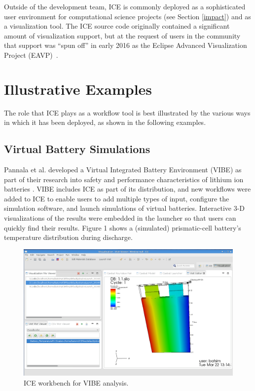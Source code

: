 Outside of the development team, ICE is commonly deployed as a
sophisticated user environment for computational science projects 
(see Section \ref{impact}) and as a visualization tool. The ICE source code originally contained a
significant amount of visualization support, but at the request of users
in the community that support was ``spun off'' in early 2016 as the 
Eclipse Advanced Visualization Project (EAVP)~\cite{billings_eclipse_2015}.

\section{Illustrative Examples}\label{illustrative-examples}

The role that ICE plays as a workflow tool is best illustrated by the
various ways in which it has been deployed, as shown in the following 
examples.

\subsection{Virtual Battery
Simulations}\label{virtual-battery-simulations}

Pannala et al. developed a Virtual Integrated Battery Environment (VIBE)
as part of their research into safety and performance characteristics of
lithium ion batteries \cite{pannala_multiscale_2015}. VIBE includes ICE
as part of its distribution, and new workflows were added to ICE to enable users
to add multiple types of input, configure the simulation software, and launch
simulations of virtual batteries. Interactive 3-D visualizations of the
results were embedded in the launcher so that users can quickly find
their results. Figure 1 shows a (simulated) prismatic-cell battery's temperature
distribution during discharge.

\begin{figure}[htbp]
\centering
\includegraphics[width=\textwidth]{images/vibe_20151016.png}
\caption{ICE workbench for VIBE analysis.}
\end{figure}

